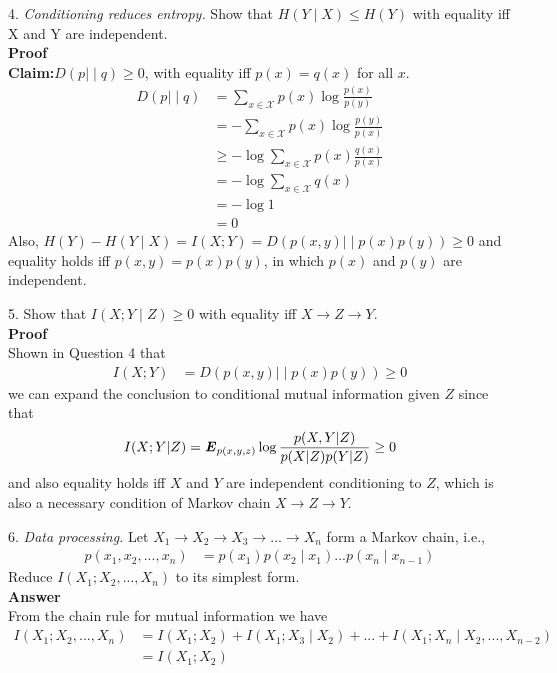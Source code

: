 \documentclass[12pt]{article}
\begin{document}
	\par
	4. \textit{Conditioning reduces entropy.} Show that $H(Y{\mid}X) \leq H(Y)$ with equality iff X and Y are independent.\\
	\textbf{Proof} \\
	\textbf{Claim:}$D(p{\mid\mid}q) \geq 0$, with equality iff $p(x) = q(x)$ for all $x$. 
	\begin{align*}
		D(p{\mid\mid}q) &= \sum_{x\in\mathcal{X}} p(x)\log\frac{p(x)}{p(y)} \\
					    &= -\sum_{x\in\mathcal{X}} p(x)\log\frac{p(y)}{p(x)} \\
					    &\geq -\log\sum_{x\in\mathcal{X}}p(x)\frac{q(x)}{p(x)} \\
					    &= -\log\sum_{x\in\mathcal{X}}q(x) \\
					    &= -\log1 \\
					    &= 0
	\end{align*}	
	Also, $H(Y)-H(Y{\mid}X) = I(X;Y) = D(p(x,y){\mid\mid}p(x)p(y)) \geq 0$ and equality holds iff $p(x,y) = p(x)p(y)$, in which $p(x)$ and $p(y)$ are independent. \\
	
	\par 
	5. Show that $I(X;Y{\mid}Z)\geq0$ with equality iff $X\rightarrow Z\rightarrow Y$. \\ 
	\textbf{Proof} \\
	Shown in Question 4 that 
	\begin{align*}
		I(X;Y) &= D(p(x,y){\mid\mid}p(x)p(y)) \geq 0
	\end{align*}
	we can expand the conclusion to conditional mutual information given $Z$ since that 
	\begin{align*}
		I(X;Y{\mid}Z) = \textbf{\textit{E}}_{p(x,y,z)}\log\frac{p(X,Y|Z)}{p(X|Z)p(Y|Z)} \geq 0
	\end{align*}
	and also equality holds iff $X$ and $Y$ are independent conditioning to $Z$, which is also a necessary condition of Markov chain $X\rightarrow Z\rightarrow Y$.\\
	
	\par 
	6. \textit{Data processing.} Let $X_1\rightarrow X_2\rightarrow X_3\rightarrow ... \rightarrow X_n$ form a Markov chain, i.e., 
	\begin{align*}
		p(x_1,x_2,...,x_n) &= p(x_1)p(x_2{\mid}x_1)...p(x_n{\mid}x_{n-1})
	\end{align*}
	Reduce $I(X_1;X_2,...,X_n)$ to its simplest form.\\
	\textbf{Answer}\\ 
	From the chain rule for mutual information we have
	\begin{align*}
		I(X_1;X_2,...,X_n) &= I(X_1;X_2) + I(X_1;X_3{\mid}X_2) +...+ I(X_1;X_n{\mid}X_2,...,X_{n-2}) \\
		&= I(X_1;X_2)
	\end{align*}
	
\end{document}
